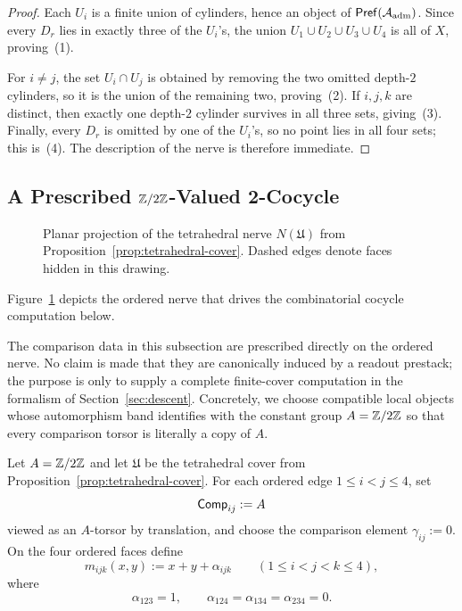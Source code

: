 \begin{proof}
Each $U_i$ is a finite union of cylinders, hence an object of
$\mathsf{Pref}(\mathcal{A}_{\mathrm{adm}})$.  Since every $D_r$ lies in exactly three of the
$U_i$'s, the union $U_1\cup U_2\cup U_3\cup U_4$ is all of $X$, proving~(1).

For $i\neq j$, the set $U_i\cap U_j$ is obtained by removing the two omitted
depth-$2$ cylinders, so it is the union of the remaining two, proving~(2).  If
$i,j,k$ are distinct, then exactly one depth-$2$ cylinder survives in all three
sets, giving~(3).  Finally, every $D_r$ is omitted by one of the $U_i$'s, so
no point lies in all four sets; this is~(4).  The description of the nerve is
therefore immediate.
\end{proof}

\subsection{A Prescribed \texorpdfstring{$\mathbb{Z}/2\mathbb{Z}$}{Z/2Z}-Valued 2-Cocycle}


\begin{figure}[ht]
\centering
{}
\caption{Planar projection of the tetrahedral nerve $N(\mathfrak{U})$ from Proposition~\ref{prop:tetrahedral-cover}.  Dashed edges denote faces hidden in this drawing.}
\label{fig:tetrahedral-nerve}
\end{figure}

Figure~\ref{fig:tetrahedral-nerve} depicts the ordered nerve that drives the
combinatorial cocycle computation below.

The comparison data in this subsection are prescribed directly on the ordered
nerve.  No claim is made that they are canonically induced by a readout
prestack; the purpose is only to supply a complete finite-cover computation in
the formalism of Section~\ref{sec:descent}.  Concretely, we choose compatible
local objects whose automorphism band identifies with the constant group
$A=\mathbb{Z}/2\mathbb{Z}$ so that every comparison torsor is literally a copy of $A$.

\begin{definition}
\label{def:tetrahedral-prescribed-datum}
Let $A=\mathbb{Z}/2\mathbb{Z}$ and let $\mathfrak{U}$ be the tetrahedral cover from
Proposition~\ref{prop:tetrahedral-cover}.  For each ordered edge
$1\le i<j\le 4$, set
\[
\mathsf{Comp}_{ij}:=A
\]
viewed as an $A$-torsor by translation, and choose the comparison element
$\gamma_{ij}:=0$.  On the four ordered faces define
\[
m_{ijk}(x,y):=x+y+\alpha_{ijk}
\qquad
(1\le i<j<k\le 4),
\]
where
\[
\alpha_{123}=1,
\qquad
\alpha_{124}=\alpha_{134}=\alpha_{234}=0.
\]
\end{definition}

